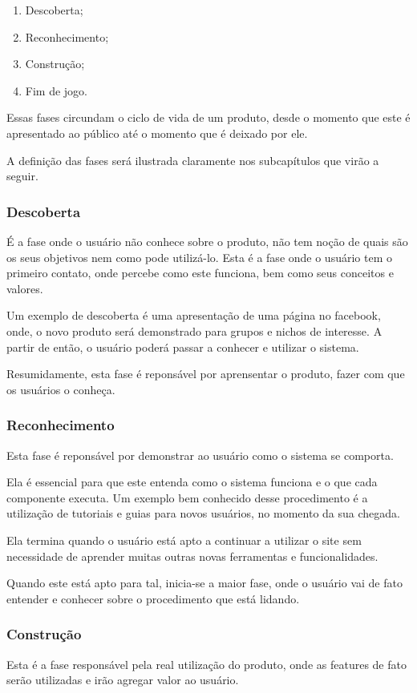 \begin{enumerate}
    \item Descoberta;
    \item Reconhecimento;
    \item Construção;
    \item Fim de jogo.
\end{enumerate}

Essas fases circundam o ciclo de vida de um produto, desde o momento que este
é apresentado ao público até o momento que é deixado por ele.

A definição das fases será ilustrada claramente nos subcapítulos que virão a seguir.

\subsubsection{Descoberta}
\label{sub:descoperta}
É a fase onde o usuário não conhece sobre o produto, não tem noção de quais são
os
seus objetivos nem como pode utilizá-lo. Esta é a fase onde o usuário tem o primeiro
contato, onde percebe como este funciona, bem como seus conceitos e valores.

Um exemplo de descoberta é uma apresentação de uma página no facebook, onde,
o novo produto será demonstrado para grupos e nichos de interesse. A partir
de então, o usuário poderá passar a conhecer e utilizar o sistema.

Resumidamente, esta fase é reponsável por aprensentar o produto, fazer
com que os usuários o conheça.

\subsubsection{Reconhecimento}
\label{sub:reconhecimento}
Esta fase é reponsável por demonstrar ao usuário como o sistema se comporta.

Ela é essencial para que este entenda como o sistema funciona e o que cada
componente executa. Um exemplo bem conhecido desse procedimento é a utilização
de tutoriais e guias para novos usuários, no momento da sua chegada.

Ela termina quando o usuário está apto a continuar a utilizar o site sem
necessidade de aprender muitas outras novas ferramentas e funcionalidades.

Quando este está apto para tal, inicia-se a maior fase, onde o usuário
vai de fato entender e conhecer sobre o procedimento que está lidando.

\subsubsection{Construção}
\label{sub:constru_o}
Esta é a fase responsável pela real utilização do produto, onde as features
de fato serão utilizadas e irão agregar valor ao usuário.

